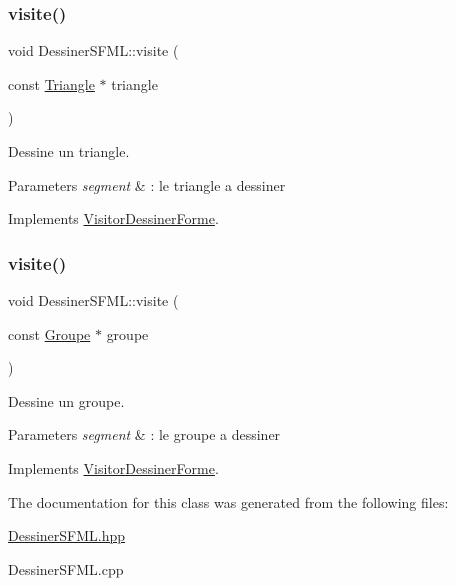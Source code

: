 \mbox{\label{class_dessiner_s_f_m_l_ae06c6ea55ae3fc2f9c230a8639c14108}} 
\subsubsection{\texorpdfstring{visite()}{visite()}\hspace{0.1cm}{\footnotesize\ttfamily [4/5]}}
{\footnotesize\ttfamily void Dessiner\+S\+F\+M\+L\+::visite (\begin{DoxyParamCaption}\item[{const \mbox{\hyperlink{class_triangle}{Triangle}} $\ast$}]{triangle }\end{DoxyParamCaption})\hspace{0.3cm}{\ttfamily [virtual]}}



Dessine un triangle. 


\begin{DoxyParams}{Parameters}
{\em segment} & \+: le triangle a dessiner \\
\hline
\end{DoxyParams}


Implements \mbox{\hyperlink{class_visitor_dessiner_forme}{Visitor\+Dessiner\+Forme}}.

\mbox{\label{class_dessiner_s_f_m_l_a7269769a1a0756b590fd5678a179245d}} 
\subsubsection{\texorpdfstring{visite()}{visite()}\hspace{0.1cm}{\footnotesize\ttfamily [5/5]}}
{\footnotesize\ttfamily void Dessiner\+S\+F\+M\+L\+::visite (\begin{DoxyParamCaption}\item[{const \mbox{\hyperlink{class_groupe}{Groupe}} $\ast$}]{groupe }\end{DoxyParamCaption})\hspace{0.3cm}{\ttfamily [virtual]}}



Dessine un groupe. 


\begin{DoxyParams}{Parameters}
{\em segment} & \+: le groupe a dessiner \\
\hline
\end{DoxyParams}


Implements \mbox{\hyperlink{class_visitor_dessiner_forme}{Visitor\+Dessiner\+Forme}}.



The documentation for this class was generated from the following files\+:\begin{DoxyCompactItemize}
\item 
\mbox{\hyperlink{_dessiner_s_f_m_l_8hpp}{Dessiner\+S\+F\+M\+L.\+hpp}}\item 
Dessiner\+S\+F\+M\+L.\+cpp\end{DoxyCompactItemize}

